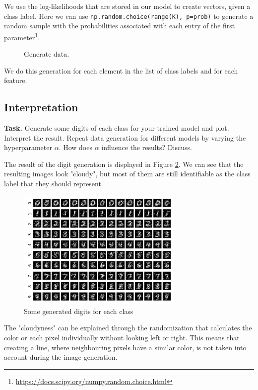 \documentclass{support/acm_proc_article-sp}
\begin{document}
    We use the log-likelihoods that are stored in our model to create vectors, given a class label.
    Here we can use \lstinline{np.random.choice(range(K), p=prob)} to generate a random sample
    with the probabilities associated with each entry of the first
    parameter\footnote{\href{https://docs.scipy.org/doc/numpy-1.13.0/reference/generated/numpy.random.choice.html}{https://docs.scipy.org/numpy.random.choice.html}}.
    \begin{figure}[htbp]
        \centering
        \lstset{numbers=none,xleftmargin=0em}
        
        \caption{Generate data.}
        \label{fig:generation}
    \end{figure}
    We do this generation for each element in the list of class labels and for each feature.

    \subsection{Interpretation}

    \textbf{Task.} Generate some digits of each class for your trained model and plot.
    Interpret the result.
    Repeat data generation for different models by varying the hyperparameter $\alpha$.
    How does $\alpha$ influence the results?
    Discuss.

    The result of the digit generation is displayed in Figure \ref{fig:generated-digits}.
    We can see that the resulting images look "cloudy", but most of them are still identifiable as the class label that
    they should represent.
    \begin{figure}[!htbp]
        \centering
        \includegraphics[width=8cm]{images/generated-digits.png}
        \caption{Some generated digits for each class}
        \label{fig:generated-digits}
    \end{figure}
    The "cloudyness" can be explained through the randomization that calculates the color or each pixel individually
    without looking left or right.
    This means that creating a line, where neighbouring pixels have a similar color, is not taken into account during the
    image generation.
\end{document}
